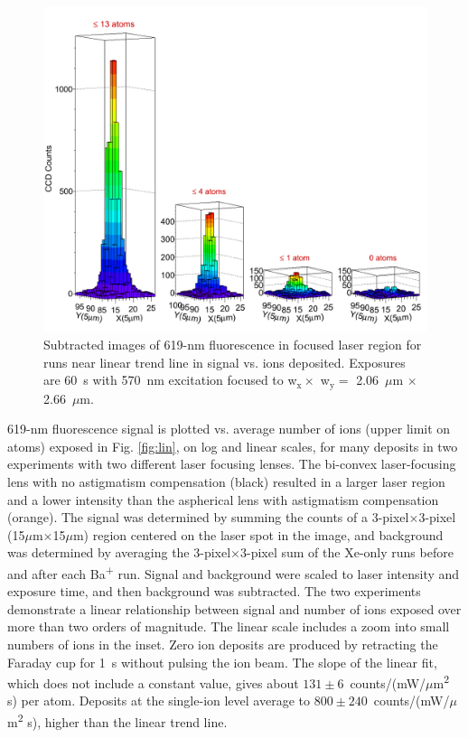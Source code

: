 \begin{figure} %
        \centering
                \includegraphics[width=.99\textwidth]{figures/train.png}
                \caption{Subtracted images of 619-nm fluorescence in focused laser region for runs near linear trend line in signal vs. ions deposited.  Exposures are 60~s with 570~nm excitation focused to w$_{\text{x}} \times$ w$_{\text{y}} =$ 2.06~$\mu$m $\times$ 2.66~$\mu$m.}
\label{fig:train}
\end{figure}

619-nm fluorescence signal is plotted vs. average number of ions (upper limit on atoms) exposed in Fig. \ref{fig:lin}, on log and linear scales, for many deposits in two experiments with two different laser focusing lenses.  The bi-convex laser-focusing lens with no astigmatism compensation (black) resulted in a larger laser region and a lower intensity than the aspherical lens with astigmatism compensation (orange).  The signal was determined by summing the counts of a 3-pixel$\times$3-pixel (15$\mu$m$\times$15$\mu$m) region centered on the laser spot in the image, and background was determined by averaging the 3-pixel$\times$3-pixel sum of the Xe-only runs before and after each Ba\textsuperscript{+} run.  Signal and background were scaled to laser intensity and exposure time, and then background was subtracted.  The two experiments demonstrate a linear relationship between signal and number of ions exposed over more than two orders of magnitude.  The linear scale includes a zoom into small numbers of ions in the inset.  Zero ion deposits are produced by retracting the Faraday cup for 1~s without pulsing the ion beam.  The slope of the linear fit, which does not include a constant value, gives about $131 \pm 6$~counts/(mW/$\mu$m\textsuperscript{2} s) per atom.  Deposits at the single-ion level average to $800 \pm 240$~counts/(mW/$\mu$m\textsuperscript{2} s), higher than the linear trend line.

